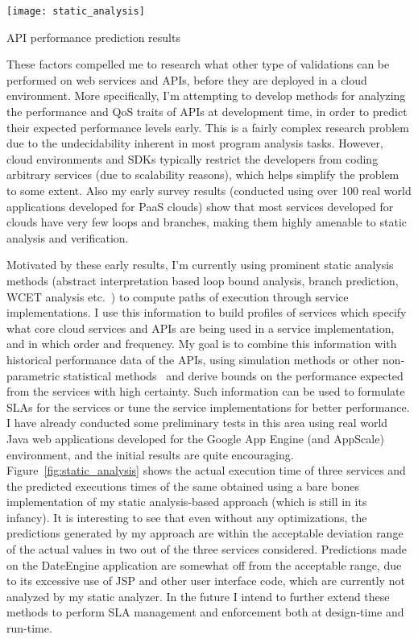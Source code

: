 \begin{floatingfigure}[rb]{2.8in}
\vspace{-0.1in}
\texttt{[image: static\_analysis]}
\vspace{-0.08in}
\caption{API performance prediction results\label{fig:static_analysis}}
\end{floatingfigure}

These factors compelled me to research what other type of validations can be performed
on web services and APIs, before they are deployed in a cloud environment.
More specifically, I'm attempting to develop methods for analyzing the performance and
QoS traits of APIs at development time, in order to predict their expected performance 
levels early. This is a fairly complex research problem due to the undecidability
inherent in most program analysis tasks. However, cloud environments and SDKs
typically restrict the developers from coding arbitrary services (due to scalability reasons), 
which helps simplify the problem to some extent. Also my early survey results (conducted using
over 100 real world applications developed for PaaS clouds) show that most services developed for
clouds have very few loops and branches, making them highly amenable to static analysis and
verification.

Motivated by these early results, I'm currently using
prominent static analysis methods (abstract interpretation based loop bound analysis,
branch prediction, WCET analysis etc.~\cite{ermedahl_et_al:OASIcs:2007:1194,Yeh:1991:TAT:123465.123475,bygde2010static}) 
to compute paths of execution through service 
implementations. I use this information to build profiles of services which
specify what core cloud services and APIs are being used in a service implementation,
and in which order and frequency. My goal is to combine this information with historical
performance data of the APIs, using simulation methods or other non-parametric statistical
methods~\cite{Nurmi:2007:QQB:1791551.1791556} and derive bounds on the performance expected from the services with high
certainty. 
Such information can be used to formulate SLAs for the services or tune
the service implementations for better performance. 
I have already conducted some preliminary tests in this area using real world
Java web applications developed for the Google App Engine (and AppScale) environment,
and the initial results are quite encouraging. Figure~\ref{fig:static_analysis} shows the actual
execution time of three services and the predicted executions times of the same obtained using
a bare bones implementation of my static analysis-based approach (which is still in its infancy). 
It is interesting
to see that even without any optimizations, the predictions generated by my approach are 
within the acceptable deviation range of the actual values in two out of the three services considered.
Predictions made on the DateEngine application are somewhat off from the acceptable range, due
to its excessive use of JSP and other user interface code, which are currently not analyzed by
my static analyzer.
In the future I intend to further extend 
these methods to perform SLA management and enforcement both at design-time and run-time.